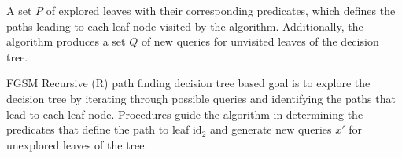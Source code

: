 A set $P$ of explored leaves with their corresponding predicates, which defines the paths leading to each leaf node visited by the algorithm. Additionally, the algorithm produces a set $Q$ of new queries for unvisited leaves of the decision tree.

FGSM Recursive (R) path finding decision tree based goal is to explore the decision tree by iterating through possible queries and identifying the paths that lead to each leaf node. Procedures guide the algorithm in determining the predicates that define the path to leaf $\text{id}_2$ and generate new queries $x'$ for unexplored leaves of the tree.
